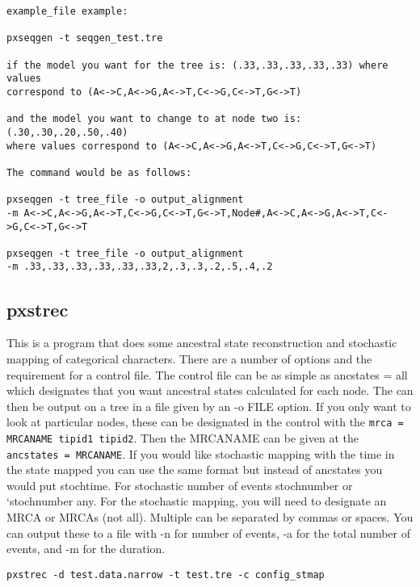 \documentclass[12pt,letterpaper]{memoir}
\begin{document}
\begin{flushleft}
\begin{verbatim}
example_file example:

pxseqgen -t seqgen_test.tre

if the model you want for the tree is: (.33,.33,.33,.33,.33) where values 
correspond to (A<->C,A<->G,A<->T,C<->G,C<->T,G<->T)

and the model you want to change to at node two is: (.30,.30,.20,.50,.40)
where values correspond to (A<->C,A<->G,A<->T,C<->G,C<->T,G<->T)

The command would be as follows: 

pxseqgen -t tree_file -o output_alignment 
-m A<->C,A<->G,A<->T,C<->G,C<->T,G<->T,Node#,A<->C,A<->G,A<->T,C<->G,C<->T,G<->T

pxseqgen -t tree_file -o output_alignment 
-m .33,.33,.33,.33,.33,.33,2,.3,.3,.2,.5,.4,.2
\end{verbatim}
\end{flushleft}

\subsection{pxstrec}

This is a program that does some ancestral state reconstruction and stochastic mapping of categorical characters. There are a number of options and the requirement for a control file. The control file can be as simple as ancstates = all which designates that you want ancestral states calculated for each node. The can then be output on a tree in a file given by an -o FILE option. If you only want to look at particular nodes, these can be designated in the control with the \texttt{mrca = MRCANAME tipid1 tipid2}. Then the MRCANAME can be given at the \texttt{ancstates = MRCANAME}. If you would like stochastic mapping with the time in the state mapped you can use the same format but instead of ancstates you would put stochtime. For stochastic number of events stochnumber or `stochnumber any. For the stochastic mapping, you will need to designate an MRCA or MRCAs (not all). Multiple can be separated by commas or spaces. You can output these to a file with -n for number of events, -a for the total number of events, and -m for the duration. 

\begin{flushleft}
\begin{verbatim}
pxstrec -d test.data.narrow -t test.tre -c config_stmap
\end{verbatim}
\end{flushleft}
\end{document}
